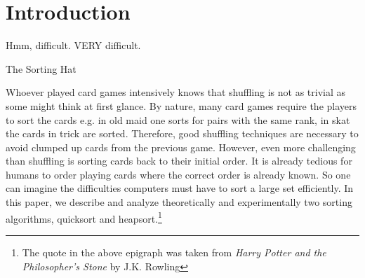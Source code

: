 \section{Introduction}
\vspace{2cm}
\epigraph{Hmm, difficult. VERY difficult.}{The Sorting Hat}
\noindent Whoever played card games intensively knows that shuffling is not as trivial as some might think at first glance. By nature, many card games require the players to sort the cards e.g. in old maid one sorts for pairs with the same rank, in skat the cards in trick are sorted. Therefore, good shuffling techniques are necessary to avoid clumped up cards from the previous game. However, even more challenging than shuffling is sorting cards back to their initial order. It is already tedious for humans to order playing cards where the correct order is already known. So one can imagine the difficulties computers must have to sort a large set efficiently. In this paper, we describe and analyze theoretically and experimentally two sorting algorithms, quicksort and heapsort.\footnote{The quote in the above epigraph was taken from \textit{Harry Potter and the Philosopher's Stone} by J.K. Rowling}
